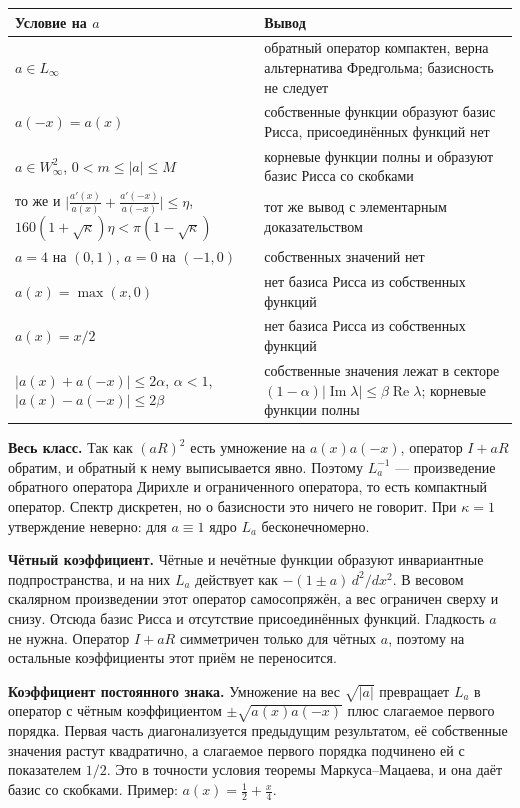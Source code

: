 \documentclass[12pt,a4paper]{article}
\begin{document}
\begin{center}
\renewcommand{\arraystretch}{1.35}
\begin{tabular}{|>{\raggedright\arraybackslash}p{}|>{\raggedright\arraybackslash}p{}|}
\hline
\textbf{Условие на $a$} & \textbf{Вывод}\\\hline
$a\in L_\infty$ & обратный оператор компактен, верна альтернатива Фредгольма; базисность
не следует\\\hline
$a(-x)=a(x)$ & собственные функции образуют базис Рисса, присоединённых функций
нет\\\hline
$a\in W^2_\infty$, $0<m\le|a|\le M$ & корневые функции полны и образуют базис Рисса со
скобками\\\hline
то же и $\bigl|\frac{a'(x)}{a(x)}+\frac{a'(-x)}{a(-x)}\bigr|\le\eta$,
$160(1+\sqrt\kappa)\eta<\pi(1-\sqrt\kappa)$ & тот же вывод с элементарным
доказательством\\\hline
$a=4$ на $(0,1)$, $a=0$ на $(-1,0)$ & собственных значений нет\\\hline
$a(x)=\max(x,0)$ & нет базиса Рисса из собственных функций\\\hline
$a(x)=x/2$ & нет базиса Рисса из собственных функций\\\hline
$|a(x)+a(-x)|\le2\alpha$, $\alpha<1$, $|a(x)-a(-x)|\le2\beta$ & собственные значения лежат
в секторе $(1-\alpha)|\operatorname{Im}\lambda|\le\beta\operatorname{Re}\lambda$; корневые
функции полны\\\hline
\end{tabular}
\end{center}

\textbf{Весь класс.} Так как $(aR)^2$ есть умножение на $a(x)a(-x)$, оператор $I+aR$
обратим, и обратный к нему выписывается явно. Поэтому $L_a^{-1}$ --- произведение
обратного оператора Дирихле и ограниченного оператора, то есть компактный оператор.
Спектр дискретен, но о базисности это ничего не говорит. При $\kappa=1$ утверждение
неверно: для $a\equiv1$ ядро $L_a$ бесконечномерно.

\textbf{Чётный коэффициент.} Чётные и нечётные функции образуют инвариантные
подпространства, и на них $L_a$ действует как $-(1\pm a)\,d^2/dx^2$. В весовом скалярном
произведении этот оператор самосопряжён, а вес ограничен сверху и снизу. Отсюда базис
Рисса и отсутствие присоединённых функций. Гладкость $a$ не нужна. Оператор $I+aR$
симметричен только для чётных $a$, поэтому на остальные коэффициенты этот приём не
переносится.

\textbf{Коэффициент постоянного знака.} Умножение на вес $\sqrt{|a|}$ превращает $L_a$ в
оператор с чётным коэффициентом $\pm\sqrt{a(x)a(-x)}$ плюс слагаемое первого порядка.
Первая часть диагонализуется предыдущим результатом, её собственные значения растут
квадратично, а слагаемое первого порядка подчинено ей с показателем $1/2$. Это в точности
условия теоремы Маркуса--Мацаева, и она даёт базис со скобками. Пример:
$a(x)=\tfrac12+\tfrac x4$.
\end{document}
